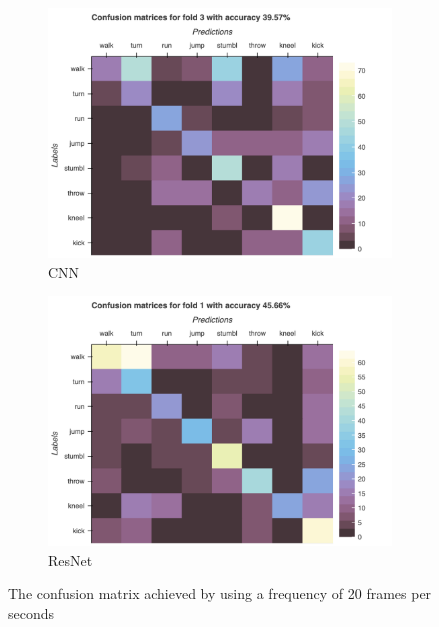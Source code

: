 \begin{figure}[H]
\begin{subfigure}[b]{0.49\textwidth}
				\includegraphics[width=\textwidth]{img/CNN-confusion_matrix_simplified.png}
				\caption{CNN}
			\end{subfigure}
			\hfill
			\begin{subfigure}[b]{0.49\textwidth}
				\centering
				\includegraphics[width=\textwidth]{img/ResNet-confusion_matrix_simplified.png}
				\caption{ResNet}
			\end{subfigure}
			\caption{The confusion matrix achieved by using a frequency of 20 frames per seconds}
			\label{fig:freq_5}
		\end{figure}
